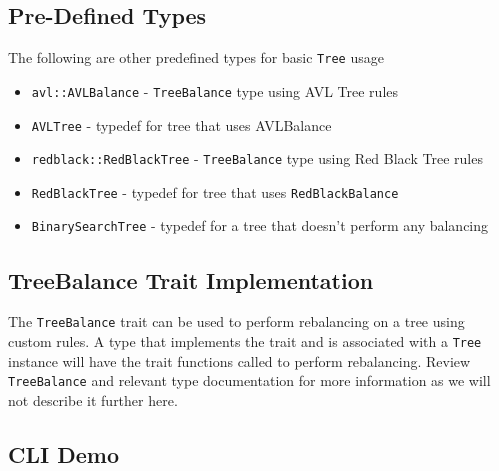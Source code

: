 \documentclass[11pt, letterpaper]{article}
\begin{document}
\subsection{Pre-Defined Types}
The following are other predefined types for basic \texttt{Tree} usage
\begin{itemize}
    \item \texttt{avl::AVLBalance} - \texttt{TreeBalance} type using AVL Tree rules
    \item \texttt{AVLTree} - typedef for tree that uses AVLBalance
    \item \texttt{redblack::RedBlackTree} - \texttt{TreeBalance} type using Red Black Tree rules
    \item \texttt{RedBlackTree} - typedef for tree that uses  \texttt{RedBlackBalance}
    \item \texttt{BinarySearchTree} - typedef for a tree that doesn't perform any balancing
\end{itemize}

\subsection{TreeBalance Trait Implementation}
The \texttt{TreeBalance} trait can be used to perform rebalancing on a tree using custom rules.
A type that implements the trait and is associated with a \texttt{Tree} instance will have the trait functions called
to perform rebalancing.  Review \texttt{TreeBalance} and relevant type documentation for more information as we will not
describe it further here.

\subsection{CLI Demo}
\end{document}
